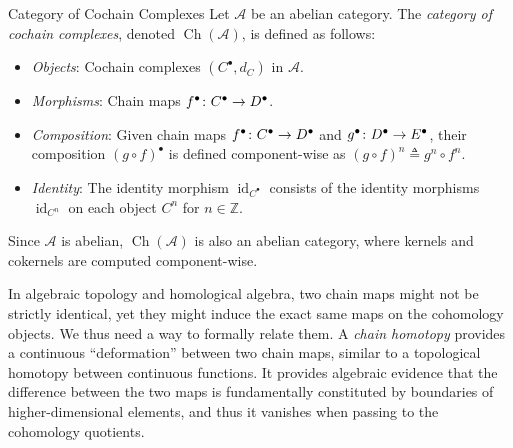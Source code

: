 \documentclass[a4paper]{article}
\begin{document}
\begin{snippetdefinition}{Category of Cochain Complexes}
    Let \(\mathcal A\) be an abelian category. The \emph{category of cochain complexes}, denoted \(\operatorname{Ch}(\mathcal A)\), is defined as follows:
    \begin{itemize}
        \item \emph{Objects}: Cochain complexes \((C^\bullet, d_C)\) in \(\mathcal A\).
        \item \emph{Morphisms}: Chain maps \(f^\bullet \colon C^\bullet \to D^\bullet\).
        \item \emph{Composition}: Given chain maps \(f^\bullet \colon C^\bullet \to D^\bullet\) and \(g^\bullet \colon D^\bullet \to E^\bullet\), their composition \((g \circ f)^\bullet\) is defined component-wise as \((g \circ f)^n \triangleq g^n \circ f^n\).
        \item \emph{Identity}: The identity morphism \(\operatorname{id}_{C^\bullet}\) consists of the identity morphisms \(\operatorname{id}_{C^n}\) on each object \(C^n\) for \(n \in \mathbb{Z}\).
    \end{itemize}
\end{snippetdefinition}

Since \(\mathcal A\) is abelian, \(\operatorname{Ch}(\mathcal A)\) is also an abelian category, where kernels and cokernels are computed component-wise.

In algebraic topology and homological algebra, two chain maps might not
be strictly identical, yet they might induce the exact same maps on the cohomology
objects. We thus need a way to formally relate them.
A \emph{chain homotopy} provides a continuous ``deformation'' between two chain maps,
similar to a topological homotopy between continuous functions.
It provides algebraic evidence that the difference between the two maps
is fundamentally constituted by boundaries of higher-dimensional elements,
and thus it vanishes when passing to the cohomology quotients.
\end{document}
